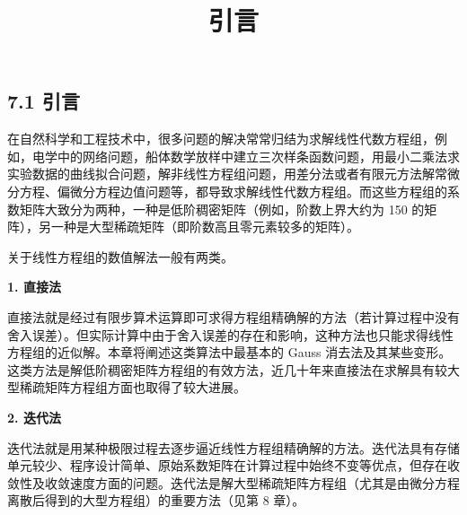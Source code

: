 \documentclass[
  10pt,
  fontset=fandol]{ctexart}
\title{引言}
\author{}
\date{}
\begin{document}
\maketitle

\subsection{7.1 引言}\label{ux5f15ux8a00}

在自然科学和工程技术中，很多问题的解决常常归结为求解线性代数方程组，例如，电学中的网络问题，船体数学放样中建立三次样条函数问题，用最小二乘法求实验数据的曲线拟合问题，解非线性方程组问题，用差分法或者有限元方法解常微分方程、偏微分方程边值问题等，都导致求解线性代数方程组。而这些方程组的系数矩阵大致分为两种，一种是低阶稠密矩阵（例如，阶数上界大约为 150 的矩阵），另一种是大型稀疏矩阵（即阶数高且零元素较多的矩阵）。

关于线性方程组的数值解法一般有两类。

\textbf{1. 直接法}

直接法就是经过有限步算术运算即可求得方程组精确解的方法（若计算过程中没有舍入误差）。但实际计算中由于舍入误差的存在和影响，这种方法也只能求得线性方程组的近似解。本章将阐述这类算法中最基本的 Gauss 消去法及其某些变形。这类方法是解低阶稠密矩阵方程组的有效方法，近几十年来直接法在求解具有较大型稀疏矩阵方程组方面也取得了较大进展。

\textbf{2. 迭代法}

迭代法就是用某种极限过程去逐步逼近线性方程组精确解的方法。迭代法具有存储单元较少、程序设计简单、原始系数矩阵在计算过程中始终不变等优点，但存在收敛性及收敛速度方面的问题。迭代法是解大型稀疏矩阵方程组（尤其是由微分方程离散后得到的大型方程组）的重要方法（见第 8 章）。
\end{document}
